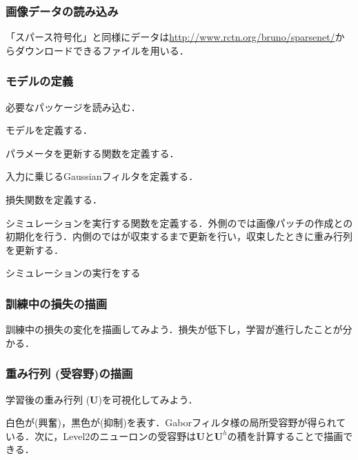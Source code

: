 \subsubsection{画像データの読み込み}
「スパース符号化」と同様にデータは\url{http://www.rctn.org/bruno/sparsenet/}からダウンロードできるファイルを用いる．

\subsubsection{モデルの定義}
必要なパッケージを読み込む．

モデルを定義する．

パラメータを更新する関数を定義する．

入力に乗じるGaussianフィルタを定義する．



損失関数を定義する．

シミュレーションを実行する関数を定義する．外側のでは画像パッチの作成との初期化を行う．内側のではが収束するまで更新を行い，収束したときに重み行列を更新する．

シミュレーションの実行をする

\subsubsection{訓練中の損失の描画}
訓練中の損失の変化を描画してみよう．損失が低下し，学習が進行したことが分かる．


\subsubsection{重み行列 (受容野)の描画}
学習後の重み行列 ($\mathbf{U}$)を可視化してみよう．


白色が\textbf{}(興奮)，黒色が\textbf{}(抑制)を表す．Gaborフィルタ様の局所受容野が得られている．次に，Level2のニューロンの受容野は$\mathbf{U}$と$\mathbf{U}^h$の積を計算することで描画できる．


